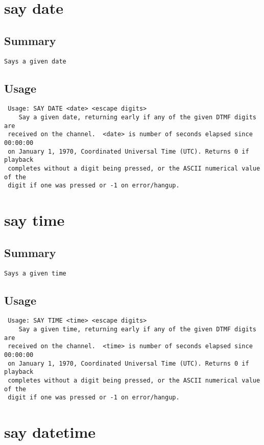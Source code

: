 \section{say date}
\subsection{Summary}
\begin{verbatim}
Says a given date
\end{verbatim}
\subsection{Usage}
\begin{verbatim}
 Usage: SAY DATE <date> <escape digits>
	Say a given date, returning early if any of the given DTMF digits are
 received on the channel.  <date> is number of seconds elapsed since 00:00:00
 on January 1, 1970, Coordinated Universal Time (UTC). Returns 0 if playback
 completes without a digit being pressed, or the ASCII numerical value of the
 digit if one was pressed or -1 on error/hangup.

\end{verbatim}


\section{say time}
\subsection{Summary}
\begin{verbatim}
Says a given time
\end{verbatim}
\subsection{Usage}
\begin{verbatim}
 Usage: SAY TIME <time> <escape digits>
	Say a given time, returning early if any of the given DTMF digits are
 received on the channel.  <time> is number of seconds elapsed since 00:00:00
 on January 1, 1970, Coordinated Universal Time (UTC). Returns 0 if playback
 completes without a digit being pressed, or the ASCII numerical value of the
 digit if one was pressed or -1 on error/hangup.

\end{verbatim}


\section{say datetime}
